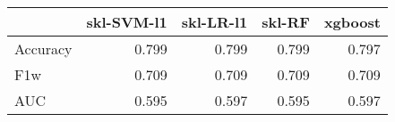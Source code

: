 \begin{tabular}{lrrrr}
\toprule
{} &  skl-SVM-l1 &  skl-LR-l1 &  skl-RF &  xgboost \\
\midrule
Accuracy &       0.799 &      0.799 &   0.799 &    0.797 \\
F1w      &       0.709 &      0.709 &   0.709 &    0.709 \\
AUC      &       0.595 &      0.597 &   0.595 &    0.597 \\
\bottomrule
\end{tabular}

